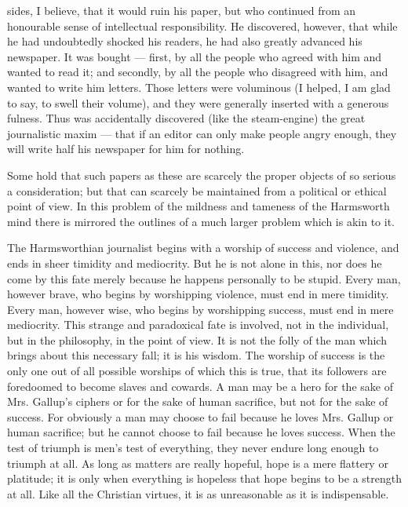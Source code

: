 sides, I believe, that it would ruin his paper, but who continued from an honourable sense of intellectual responsibility. He discovered, however, that while he had undoubtedly shocked his readers, he had also greatly advanced his newspaper. It was bought — first, by all the people who agreed with him and wanted to read it; and secondly, by all the people who disagreed with him, and wanted to write him letters. Those letters were voluminous (I helped, I am glad to say, to swell their volume), and they were generally inserted with a generous fulness. Thus was accidentally discovered (like the steam-engine) the great journalistic maxim — that if an editor can only make people angry enough, they will write half his newspaper for him for nothing.

Some hold that such papers as these are scarcely the proper objects of so serious a consideration; but that can scarcely be maintained from a political or ethical point of view. In this problem of the mildness and tameness of the Harmsworth mind there is mirrored the outlines of a much larger problem which is akin to it.

The Harmsworthian journalist begins with a worship of success and violence, and ends in sheer timidity and mediocrity. But he is not alone in this, nor does he come by this fate merely because he happens personally to be stupid. Every man, however brave, who begins by worshipping violence, must end in mere timidity. Every man, however wise, who begins by worshipping success, must end in mere mediocrity. This strange and paradoxical fate is involved, not in the individual, but in the philosophy, in the point of view. It is not the folly of the man which brings about this necessary fall; it is his wisdom. The worship of success is the only one out of all possible worships of which this is true, that its followers are foredoomed to become slaves and cowards. A man may be a hero for the sake of Mrs. Gallup’s ciphers or for the sake of human sacrifice, but not for the sake of success. For obviously a man may choose to fail because he loves Mrs. Gallup or human sacrifice; but he cannot choose to fail because he loves success. When the test of triumph is men’s test of everything, they never endure long enough to triumph at all. As long as matters are really hopeful, hope is a mere flattery or platitude; it is only when everything is hopeless that hope begins to be a strength at all. Like all the Christian virtues, it is as unreasonable as it is indispensable.

